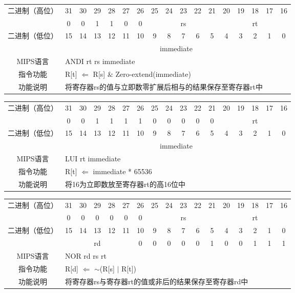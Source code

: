 \begin{table}
\begin{tabular}{|c|c|c|c|c|c|c|c|c|c|c|c|c|c|c|c|c|}
\hline
\multirow{2}{*}{二进制（高位）} &
31&30&29&28&27&26&25&24&23&22&21&20&19&18&17&16\\
\cline{2-17}
&
0&0&1&1&0&
0&
\multicolumn{5}{c|}{rs}&
\multicolumn{5}{c|}{rt}\\
\hline
\multirow{2}{*}{二进制（低位）} &
15&14&13&12&11&10&9&8&7&6&5&4&3&2&1&0\\
\cline{2-17}
&
\multicolumn{16}{c|}{immediate}\\
\hline
MIPS语言&
\multicolumn{16}{l|}{ANDI rt rs immediate}\\
\hline
指令功能&
\multicolumn{16}{l|}{R[t] $\Leftarrow$ R[s] $\&$ Zero-extend(immediate)}\\
\hline
功能说明&
\multicolumn{16}{l|}{将寄存器rs的值与立即数零扩展后相与的结果保存至寄存器rt中}\\
\hline
\end{tabular}
\end{table}

\begin{table}
\begin{tabular}{|c|c|c|c|c|c|c|c|c|c|c|c|c|c|c|c|c|}
\hline
\multirow{2}{*}{二进制（高位）} &
31&30&29&28&27&26&25&24&23&22&21&20&19&18&17&16\\
\cline{2-17}
&
0&0&1&1&1&
1&0&0&0&0&
0&
\multicolumn{5}{c|}{rt}\\
\hline
\multirow{2}{*}{二进制（低位）} &
15&14&13&12&11&10&9&8&7&6&5&4&3&2&1&0\\
\cline{2-17}
&
\multicolumn{16}{c|}{immediate}\\
\hline
MIPS语言&
\multicolumn{16}{l|}{LUI rt immediate}\\
\hline
指令功能&
\multicolumn{16}{l|}{R[t] $\Leftarrow$ immediate * 65536}\\
\hline
功能说明&
\multicolumn{16}{l|}{将16为立即数放至寄存器rt的高16位中}\\
\hline
\end{tabular}
\end{table}

\begin{table}
\begin{tabular}{|c|c|c|c|c|c|c|c|c|c|c|c|c|c|c|c|c|}
\hline
\multirow{2}{*}{二进制（高位）} &
31&30&29&28&27&26&25&24&23&22&21&20&19&18&17&16\\
\cline{2-17}
&
0&0&0&0&0&
0&
\multicolumn{5}{c|}{rs}&
\multicolumn{5}{c|}{rt}\\
\hline
\multirow{2}{*}{二进制（低位）} &
15&14&13&12&11&10&9&8&7&6&5&4&3&2&1&0\\
\cline{2-17}
&
\multicolumn{5}{c|}{rd}&
0&0&0&0&0&
1&0&0&1&1&
1\\
\hline
MIPS语言&
\multicolumn{16}{l|}{NOR rd rs rt}\\
\hline
指令功能&
\multicolumn{16}{l|}{R[d] $\Leftarrow$ $\sim$(R[s] $\mid$ R[t])}\\
\hline
功能说明&
\multicolumn{16}{l|}{将寄存器rs与寄存器rt的值或非后的结果保存至寄存器rd中}\\
\hline
\end{tabular}
\end{table}

